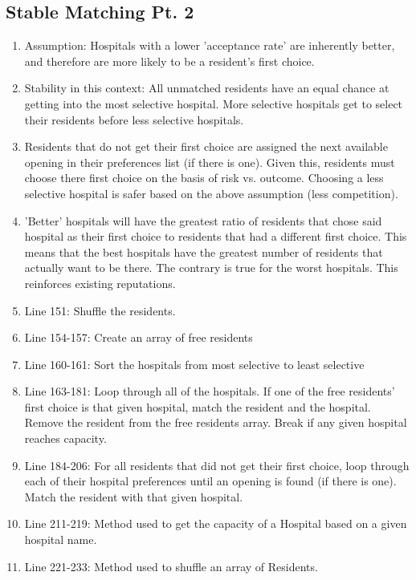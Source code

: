 \documentclass[letterpaper, 10pt,DIV=13]{scrartcl}
\numberwithin{equation}{section} %
\numberwithin{figure}{section} %
\numberwithin{table}{section} %
\begin{document}
\subsection{Stable Matching Pt. 2}
\begin{enumerate}
    \item Assumption: Hospitals with a lower 'acceptance rate' are inherently better, and therefore are more likely to be a resident's first choice.
    \item Stability in this context: All unmatched residents have an equal chance at getting into the most selective hospital. More selective hospitals get to select their residents before less selective hospitals.
    \item Residents that do not get their first choice are assigned the next available opening in their preferences list (if there is one). Given this, residents must choose there first choice on the basis of risk vs. outcome. Choosing a less selective hospital is safer based on the above assumption (less competition). 
    \item 'Better' hospitals will have the greatest ratio of residents that chose said hospital as their first choice to residents that had a different first choice. This means that the best hospitals have the greatest number of residents that actually want to be there. The contrary is true for the worst hospitals. This reinforces existing reputations.
    
    \item Line 151: Shuffle the residents.
    \item Line 154-157: Create an array of free residents
    \item Line 160-161: Sort the hospitals from most selective to least selective
    \item Line 163-181: Loop through all of the hospitals. If one of the free residents' first choice is that given hospital, match the resident and the hospital. Remove the resident from the free residents array. Break if any given hospital reaches capacity.
    \item Line 184-206: For all residents that did not get their first choice, loop through each of their hospital preferences until an opening is found (if there is one). Match the resident with that given hospital.
    \item Line 211-219: Method used to get the capacity of a Hospital based on a given hospital name.
    \item Line 221-233: Method used to shuffle an array of Residents.
\end{enumerate}
\end{document}

